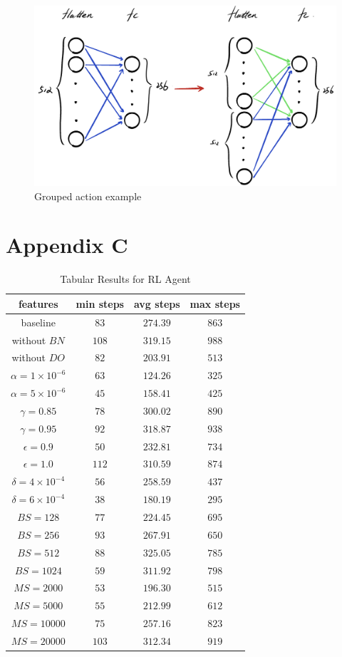 \documentclass[letterpaper]{article} %
\begin{document}
  \begin{figure}[h!]
    \centering
    \includegraphics[width=0.75\linewidth]{figures/architecutre.jpeg}
    \caption{Grouped action example}
    \label{fig:training}
  \end{figure}
  
  \newpage
  \section{Appendix C}
  \begin{table}[h!]
    \centering
    \normalsize{
      \begin{spacing}{1.9}
      \begin{tabular}{ |cccc| } 
        \hline
        features & min steps & avg steps & max steps  \\ 
        \hline
        \hline
        baseline & $83$& $274.39$ & $863$\\
        without $BN$&$108$&$319.15$&$988$\\
        without $DO$&$82$&$203.91$&$513$\\
        $\alpha=1\times 10^{-6}$&$63$&$124.26$&$325$\\
        $\alpha=5\times 10^{-6}$&$45$&$158.41$&$425$\\
        $\gamma=0.85$&$78$&$300.02$&$890$\\
        $\gamma=0.95$&$92$&$318.87$&$938$\\
        $\epsilon=0.9$&$50$&$232.81$&$734$\\
        $\epsilon=1.0$&$112$&$310.59$&$874$\\
        $\delta= 4\times 10^{-4}$&$56$&$258.59$&$437$\\
        $\delta= 6\times 10^{-4}$&$38$&$180.19$&$295$\\
        $BS=128$&$77$&$224.45$&$695$\\
        $BS=256$&$93$&$267.91$&$650$\\
        $BS=512$&$88$&$325.05$&$785$\\
        $BS=1024$&$59$&$311.92$&$798$\\
        $MS=2000$&$53$&$196.30$&$515$\\
        $MS=5000$&$55$&$212.99$&$612$\\
        $MS=10000$&$75$&$257.16$&$823$\\
        $MS=20000$&$103$&$312.34$&$919$\\
        \hline
      \end{tabular}
    \end{spacing}
    }
    \caption{Tabular Results for RL Agent}
    \label{tab:tabularResult}
  \end{table}  
  \newpage
\end{document}
